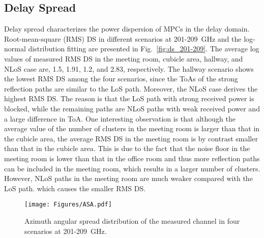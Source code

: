 \documentclass[journal,12pt,draftclsnofoot,onecolumn]{IEEEtran}
\begin{document}
\subsection{Delay Spread}\label{sec:channel_ds}
Delay spread characterizes the power dispersion of MPCs in the delay domain. Root-mean-square (RMS) DS in different scenarios at 201-209~GHz and the log-normal distribution fitting are presented in Fig.~\ref{fig:ds_201-209}. The average log values of measured RMS DS in the meeting room, cubicle area, hallway, and NLoS case are, 1.5, 1.91, 1.2, and 2.83, respectively.
The hallway scenario shows the lowest RMS DS among the four scenarios, since the ToAs of the strong reflection paths are similar to the LoS path.
Moreover, the NLoS case derives the highest RMS DS. The reason is that the LoS path with strong received power is blocked, while the remaining paths are NLoS paths with weak received power and a large difference in ToA.
One interesting observation is that although the average value of the number of clusters in the meeting room is larger than that in the cubicle area, the average RMS DS in the meeting room is by contrast smaller than that in the cubicle area. This is due to the fact that the noise floor in the meeting room is lower than that in the office room and thus more reflection paths can be included in the meeting room, which results in a larger number of clusters. However, NLoS paths in the meeting room are much weaker compared with the LoS path. which causes the smaller RMS DS. 

\begin{figure}
\centering
\texttt{[image: Figures/ASA.pdf]}
\caption{Azimuth angular spread distribution of the measured channel in four scenarios at 201-209~GHz.}
\label{fig:asa_201-209}
\end{figure}
\end{document}
